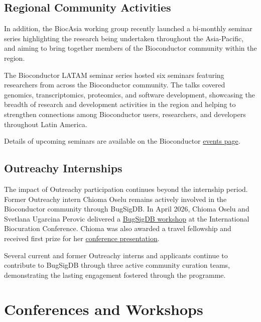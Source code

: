 \subsection{Regional Community Activities}\label{regional-community-activities}

In addition, the BiocAsia working group recently launched a bi-monthly seminar series highlighting the research being undertaken throughout the Asia-Pacific, and aiming to bring together members of the Bioconductor community within the region.

The Bioconductor LATAM seminar series hosted six seminars featuring researchers from across the Bioconductor community. The talks covered genomics, transcriptomics, proteomics, and software development, showcasing the breadth of research and development activities in the region and helping to strengthen connections among Bioconductor users, researchers, and developers throughout Latin America.

Details of upcoming seminars are available on the Bioconductor \href{https://bioconductor.org/help/events/}{events page}.

\subsection{Outreachy Internships}\label{outreachy-internships}

The impact of Outreachy participation continues beyond the internship
period. Former Outreachy intern Chioma Oselu remains actively involved
in the Bioconductor community through BugSigDB. In April 2026, Chioma
Oselu and Svetlana Ugarcina Perovic delivered a \href{https://www.bioinformaticsinstitute.africa/events/tab/6/24/19th_Annual_International_Biocuration_Conference/79}{BugSigDB workshop} at the
International Biocuration Conference. Chioma was also awarded a travel
fellowship and received first prize for her \href{https://www.linkedin.com/pulse/international-biocuration-conference-reflections-from-stephen-adeyemo-xr6ce/}{conference presentation}.

Several current and former Outreachy interns and applicants continue to
contribute to BugSigDB through three active community curation teams,
demonstrating the lasting engagement fostered through the programme.

\section{Conferences and Workshops}\label{conferences-and-workshops}

